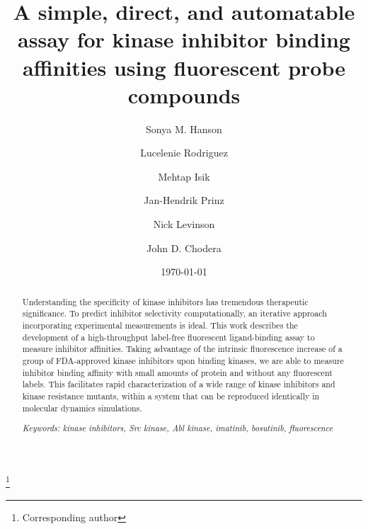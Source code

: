 \documentclass[aps,pre,twocolumn,nofootinbib,superscriptaddress,linenumbers,11point]{revtex4-1}
\begin{document}

\title{A simple, direct, and automatable assay for kinase inhibitor binding affinities using fluorescent probe compounds
}

\author{Sonya M. Hanson}
\author{Lucelenie Rodriguez}
   \author{Mehtap Isik}
\author{Jan-Hendrik Prinz}
\author{Nick Levinson}
\author{John D. Chodera}
 \thanks{Corresponding author}

\date{\today}


\begin{abstract}

Understanding the specificity of kinase inhibitors has tremendous therapeutic significance. 
To predict inhibitor selectivity computationally, an iterative approach incorporating experimental measurements is ideal. 
This work describes the development of a high-throughput label-free fluorescent ligand-binding assay to measure inhibitor affinities. 
Taking advantage of the intrinsic fluorescence increase of a group of FDA-approved kinase inhibitors upon binding kinases, we are able to measure inhibitor binding affinity with small amounts of protein and without any fluorescent labels. 
This facilitates rapid characterization of a wide range of kinase inhibitors and kinase resistance mutants, within a system that can be reproduced identically in molecular dynamics simulations.

\emph{Keywords: kinase inhibitors, Src kinase, Abl kinase, imatinib, bosutinib, fluorescence}
\end{abstract}
\end{document}
